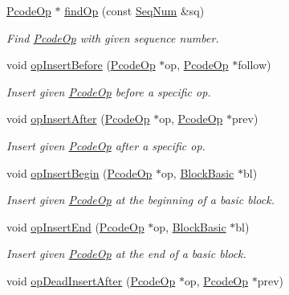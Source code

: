 \begin{DoxyCompactItemize}
\mbox{\hyperlink{class_pcode_op}{Pcode\+Op}} $\ast$ \mbox{\hyperlink{class_funcdata_a910ebb4d08eba9ee2f68965b6ef0898c}{find\+Op}} (const \mbox{\hyperlink{class_seq_num}{Seq\+Num}} \&sq)
\begin{DoxyCompactList}\small\item\em Find \mbox{\hyperlink{class_pcode_op}{Pcode\+Op}} with given sequence number. \end{DoxyCompactList}\item 
void \mbox{\hyperlink{class_funcdata_a9dd86e17a47020d06ac8dfd3bb732fe5}{op\+Insert\+Before}} (\mbox{\hyperlink{class_pcode_op}{Pcode\+Op}} $\ast$op, \mbox{\hyperlink{class_pcode_op}{Pcode\+Op}} $\ast$follow)
\begin{DoxyCompactList}\small\item\em Insert given \mbox{\hyperlink{class_pcode_op}{Pcode\+Op}} before a specific op. \end{DoxyCompactList}\item 
void \mbox{\hyperlink{class_funcdata_a3320ad92e11a48a06e21b8a55395a56b}{op\+Insert\+After}} (\mbox{\hyperlink{class_pcode_op}{Pcode\+Op}} $\ast$op, \mbox{\hyperlink{class_pcode_op}{Pcode\+Op}} $\ast$prev)
\begin{DoxyCompactList}\small\item\em Insert given \mbox{\hyperlink{class_pcode_op}{Pcode\+Op}} after a specific op. \end{DoxyCompactList}\item 
void \mbox{\hyperlink{class_funcdata_ae6341eb8ca8a8004f1c77a8e8147a286}{op\+Insert\+Begin}} (\mbox{\hyperlink{class_pcode_op}{Pcode\+Op}} $\ast$op, \mbox{\hyperlink{class_block_basic}{Block\+Basic}} $\ast$bl)
\begin{DoxyCompactList}\small\item\em Insert given \mbox{\hyperlink{class_pcode_op}{Pcode\+Op}} at the beginning of a basic block. \end{DoxyCompactList}\item 
void \mbox{\hyperlink{class_funcdata_ad544a6136ff019bbd18c45043e9b6900}{op\+Insert\+End}} (\mbox{\hyperlink{class_pcode_op}{Pcode\+Op}} $\ast$op, \mbox{\hyperlink{class_block_basic}{Block\+Basic}} $\ast$bl)
\begin{DoxyCompactList}\small\item\em Insert given \mbox{\hyperlink{class_pcode_op}{Pcode\+Op}} at the end of a basic block. \end{DoxyCompactList}\item 
void \mbox{\hyperlink{class_funcdata_a9cda5e2de1725ebf3fb885e375ea1a9d}{op\+Dead\+Insert\+After}} (\mbox{\hyperlink{class_pcode_op}{Pcode\+Op}} $\ast$op, \mbox{\hyperlink{class_pcode_op}{Pcode\+Op}} $\ast$prev)

\end{DoxyCompactItemize}
